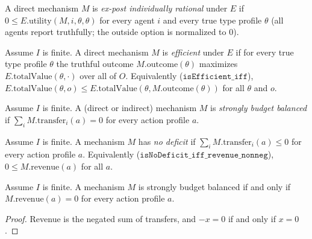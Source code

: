 \begin{definition}\label{def:MathEconLib.Mechanism.DirectMechanism.IsExPostIR}\leanok
{}
A direct mechanism $M$ is \emph{ex-post individually rational} under $E$ if $0\le E.\mathrm{utility}(M,i,\theta,\theta)$ for every agent $i$ and every true type profile $\theta$ (all agents report truthfully; the outside option is normalized to $0$).
\end{definition}

\begin{definition}\label{def:MathEconLib.Mechanism.DirectMechanism.IsEfficient}\leanok
{}
Assume $I$ is finite. A direct mechanism $M$ is \emph{efficient} under $E$ if for every true type profile $\theta$ the truthful outcome $M.\mathrm{outcome}(\theta)$ maximizes $E.\mathrm{totalValue}(\theta,\cdot)$ over all of $O$. Equivalently ($\texttt{isEfficient\_iff}$), $E.\mathrm{totalValue}(\theta,o)\le E.\mathrm{totalValue}(\theta,M.\mathrm{outcome}(\theta))$ for all $\theta$ and $o$.
\end{definition}

\begin{definition}\label{def:MathEconLib.Mechanism.IsBudgetBalanced}\leanok
{}
Assume $I$ is finite. A (direct or indirect) mechanism $M$ is \emph{strongly budget balanced} if $\sum_{i}M.\mathrm{transfer}_i(a)=0$ for every action profile $a$.
\end{definition}

\begin{definition}\label{def:MathEconLib.Mechanism.IsNoDeficit}\leanok
{}
Assume $I$ is finite. A mechanism $M$ has \emph{no deficit} if $\sum_{i}M.\mathrm{transfer}_i(a)\le 0$ for every action profile $a$. Equivalently ($\texttt{isNoDeficit\_iff\_revenue\_nonneg}$), $0\le M.\mathrm{revenue}(a)$ for all $a$.
\end{definition}

\begin{lemma}\label{thm:MathEconLib.Mechanism.isBudgetBalanced_iff_revenue_eq_zero}\leanok
{}
Assume $I$ is finite. A mechanism $M$ is strongly budget balanced if and only if $M.\mathrm{revenue}(a)=0$ for every action profile $a$.
\end{lemma}
\begin{proof}\leanok
{}
Revenue is the negated sum of transfers, and $-x=0$ if and only if $x=0$.
\end{proof}

